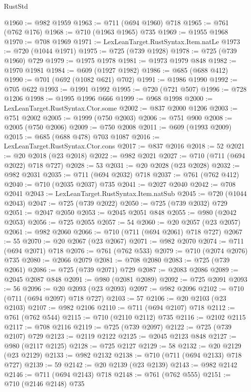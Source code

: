 \begin{lexlean}{RustStd}
\begin{coremodule}
@1960 := @982 @1959
@1963 := @711 (@694 @1960) @718
@1965 := @761 (@762 @176)
@1968 := @710 (@1963 @1965) @735
@1969 := @1955 @1968
@1970 := @708 @1969
@1971 := LexLeanTarget.RustSyntax.Item.natLe
@1973 := @720 (@1044 @1971)
@1975 := @725 (@739 @1928)
@1978 := @725 (@739 @1960) @729
@1979 := @1975 @1978
@1981 := @1973 @1979 @848
@1982 := @1970 @1981
@1984 := @609 (@1927 @1982)
@1986 := @685 (@688 @412)
@1990 := @701 (@692 (@1082 @621) @702)
@1991 := @1986 @1990
@1992 := @705 @622
@1993 := @1991 @1992
@1995 := @720 (@721 @507)
@1996 := @728 @1206
@1998 := @1995 @1996 @666
@1999 := @968 @1998
@2000 := LexLeanTarget.RustSyntax.Ctor.some
@2002 := @837 @2000 @1206
@2003 := @751 @2002
@2005 := @1999 (@750 @2003)
@2006 := @751 @900
@2008 := @2005 (@750 @2006)
@2009 := @750 @2008
@2011 := @609 (@1993 @2009)
@2015 := @685 (@688 @478) @703 @1087
@2016 := LexLeanTarget.RustSyntax.Ctor.cons
@2017 := @837 @2016
@2018 := 52
@2021 := @20 @2018 (@23 @2018)
@2022 := @982 @2021
@2027 := @710 (@711 (@694 @2022) @718 @727)
@2028 := 53
@2031 := @20 @2028 (@23 @2028)
@2032 := @982 @2031
@2035 := @711 (@694 @2032) @718
@2037 := @761 (@762 @412)
@2040 := @710 (@2035 @2037) @735
@2041 := @2027 @2040
@2042 := @708 @2041
@2043 := LexLeanTarget.RustSyntax.Item.natSub
@2045 := @720 (@1044 @2043)
@2047 := @725 (@739 @2022)
@2050 := @725 (@739 @2032) @729
@2051 := @2047 @2050
@2053 := @2045 @2051 @848
@2055 := @980 (@2042 @2053)
@2056 := @725 @2055
@2057 := 54
@2060 := @20 @2057 (@23 @2057)
@2061 := @982 @2060
@2066 := @710 (@711 (@694 @2061) @718 @727)
@2067 := 55
@2070 := @20 @2067 (@23 @2067)
@2071 := @982 @2070
@2074 := @711 (@694 @2071) @718
@2076 := @761 (@762 @533)
@2079 := @710 (@2074 @2076) @735
@2080 := @2066 @2079
@2081 := @708 @2080
@2083 := @725 (@739 @2061)
@2086 := @725 (@739 @2071) @729
@2087 := @2083 @2086
@2089 := @2045 @2087 @848
@2091 := @980 (@2081 @2089)
@2092 := @725 @2091
@2093 := 56
@2096 := @20 @2093 (@23 @2093)
@2097 := @982 @2096
@2102 := @710 (@711 (@694 @2097) @718 @727)
@2103 := 57
@2106 := @20 @2103 (@23 @2103)
@2107 := @982 @2106
@2110 := @711 (@694 @2107) @718
@2112 := @761 (@762 @544)
@2115 := @710 (@2110 @2112) @735
@2116 := @2102 @2115
@2117 := @708 @2116
@2119 := @725 (@739 @2097)
@2122 := @725 (@739 @2107) @729
@2123 := @2119 @2122
@2125 := @2045 @2123 @848
@2127 := @980 (@2117 @2125)
@2128 := @725 @2127
@2129 := 58
@2132 := @20 @2129 (@23 @2129)
@2133 := @982 @2132
@2138 := @710 (@711 (@694 @2133) @718 @727)
@2139 := 59
@2142 := @20 @2139 (@23 @2139)
@2143 := @982 @2142
@2146 := @711 (@694 @2143) @718
@2148 := @761 (@762 @555)
@2151 := @710 (@2146 @2148) @735

\end{coremodule}
\end{lexlean}
